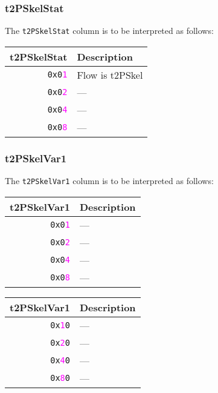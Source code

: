 \documentclass[documentation]{subfiles}
\begin{document}
\subsubsection{t2PSkelStat}\label{t2PSkelStat}
The {\tt t2PSkelStat} column is to be interpreted as follows:
\begin{longtable}{rl}
    \toprule
    {\bf t2PSkelStat} & {\bf Description}\\
    \midrule\endhead%
    {\tt 0x0\textcolor{magenta}{1}} & Flow is t2PSkel\\
    {\tt 0x0\textcolor{magenta}{2}} & ---\\
    {\tt 0x0\textcolor{magenta}{4}} & ---\\
    {\tt 0x0\textcolor{magenta}{8}} & ---\\
    \bottomrule
\end{longtable}

\subsubsection{t2PSkelVar1}\label{t2PSkelVar1}
The {\tt t2PSkelVar1} column is to be interpreted as follows:\\
\begin{minipage}{.45\textwidth}
    \begin{longtable}{rl}
        \toprule
        {\bf t2PSkelVar1} & {\bf Description}\\
        \midrule\endhead%
        {\tt 0x0\textcolor{magenta}{1}} & ---\\
        {\tt 0x0\textcolor{magenta}{2}} & ---\\
        {\tt 0x0\textcolor{magenta}{4}} & ---\\
        {\tt 0x0\textcolor{magenta}{8}} & ---\\
        \bottomrule
    \end{longtable}
\end{minipage}
\hfill
\begin{minipage}{.45\textwidth}
    \begin{longtable}{rl}
        \toprule
        {\bf t2PSkelVar1} & {\bf Description}\\
        \midrule\endhead%
        {\tt 0x\textcolor{magenta}{1}0} & ---\\
        {\tt 0x\textcolor{magenta}{2}0} & ---\\
        {\tt 0x\textcolor{magenta}{4}0} & ---\\
        {\tt 0x\textcolor{magenta}{8}0} & ---\\
        \bottomrule
    \end{longtable}
\end{minipage}
\end{document}
